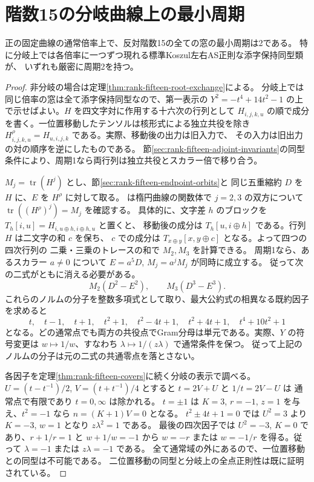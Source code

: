 \section{階数15の分岐曲線上の最小周期}
\label{sec:rank-fifteen-branch-period}
\begin{theorem}\label{thm:rank-fifteen-branch-period}
正の固定曲線の通常倍率上で、反対階数15の全ての窓の最小周期は2である。
特に分岐上では各倍率に一つずつ現れる標準Koszul左右AS正則な添字保持同型類が、
いずれも厳密に周期2を持つ。
\end{theorem}
\begin{proof}
非分岐の場合は定理\ref{thm:rank-fifteen-root-exchange}による。
分岐上では同じ倍率の窓は全て添字保持同型なので、第一表示の
$Y^2=-t^4+14t^2-1$ の上で示せばよい。$H$ を四文字対に作用する十六次の行列として
$H_{i,j,k,u}$ の順で成分を書く。一位置移動したテンソルは核形式による独立共役を除き
$H^\rho_{i,j,k,u}=H_{u,i,j,k}$ である。実際、移動後の出力は旧入力で、
その入力は旧出力の対の順序を逆にしたものである。
節\ref{sec:rank-fifteen-adjoint-invariants}の同型条件により、周期1なら両行列は独立共役とスカラー倍で移り合う。

$M_j=\operatorname{tr}(H^j)$ とし、節\ref{sec:rank-fifteen-endpoint-orbits}と
同じ五重縮約 $D$ を $H$ に、$E$ を $H^\rho$ に対して取る。
 は楕円曲線の関数体で
$j=2,3$ の双方について $\operatorname{tr}((H^\rho)^j)=M_j$ を確認する。
具体的に、文字差 $h$ のブロックを $T_h[i,u]=H_{i,u\oplus h,i\oplus h,u}$ と置くと、
移動後の成分は $T_h[u,i\oplus h]$ である。行列 $H$ は二文字の和 $c$ を保ち、
$c$ での成分は $T_{x\oplus y}[x,y\oplus c]$ となる。よって四つの四次行列の
二乗・三乗のトレースの和で $M_2,M_3$ を計算できる。
周期1なら、あるスカラー $a\ne0$ について $E=a^5D$, $M_j=a^j M_j$ が同時に成立する。
従って次の二式がともに消える必要がある。
\[
 M_2(D^2-E^2),\qquad M_3(D^3-E^3).
\]
これらのノルムの分子を整数多項式として取り、最大公約式の相異なる既約因子を求めると
\[
 t,\quad t-1,\quad t+1,\quad t^2+1,\quad
 t^2-4t+1,\quad t^2+4t+1,\quad t^4+10t^2+1
\]
となる。どの通常点でも両方の共役点でGram分母は単元である。実際、$Y$ の符号変更は
$w\mapsto1/w$、すなわち $\lambda\mapsto1/(z\lambda)$ で通常条件を保つ。
従って上記のノルムの分子は元の二式の共通零点を落とさない。

各因子を定理\ref{thm:rank-fifteen-covers}に続く分岐の表示で調べる。
$U=(t-t^{-1})/2$, $V=(t+t^{-1})/4$ とすると $t=2V+U$ と $1/t=2V-U$ は
通常点で有限であり $t=0,\infty$ は除かれる。
$t=\pm1$ は $K=3$, $r=-1$, $z=1$ を与え、$t^2=-1$ なら $n=(K+1)V=0$ となる。
$t^2\pm4t+1=0$ では $U^2=3$ より $K=-3$, $w=1$ となり $z\lambda^2=1$ である。
最後の四次因子では $U^2=-3$, $K=0$ であり、$r+1/r=1$ と $w+1/w=-1$ から
$w=-r$ または $w=-1/r$ を得る。従って $\lambda=-1$ または $z\lambda=-1$ である。
全て通常域の外にあるので、一位置移動との同型は不可能である。
二位置移動の同型と分岐上の全点正則性は既に証明されている。
\end{proof}
